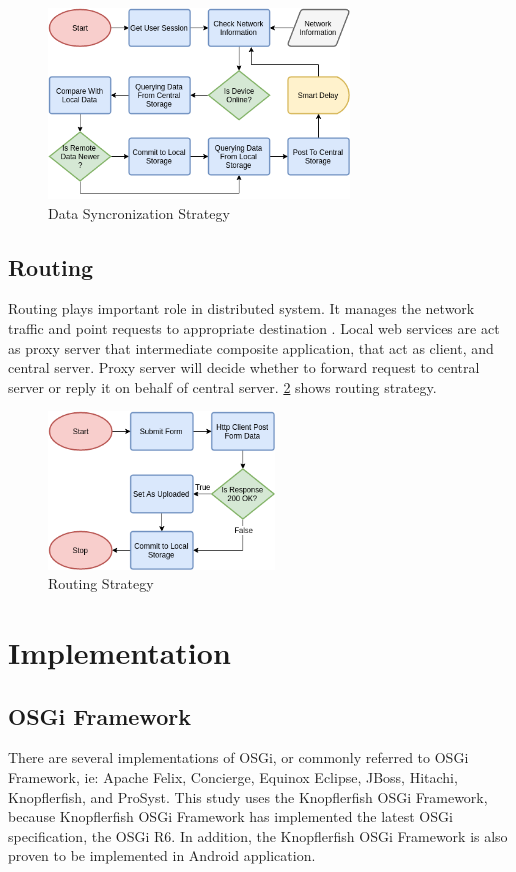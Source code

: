 \documentclass[conference]{IEEEtran}
\begin{document}
\begin{figure}
    \centering
    \includegraphics[width=8cm]{../../Resources/Images/data-sync-flowchart}
    \caption{Data Syncronization Strategy}
    \label{fig:data-sync-flowchart}
\end{figure}




\subsection{Routing}
Routing plays important role in distributed system. It manages the network traffic and point requests to appropriate destination \cite{takdir_multi-layer_2014}. Local web services are act as proxy server that intermediate composite application, that act as client, and central server. Proxy server will decide whether to forward request to central server or reply it on behalf of central server. \figurename{\ref{fig:routing-flowchart}} shows routing strategy.

\begin{figure}
    \centering
    \includegraphics[width=6cm]{../../Resources/Images/routing-flowchart}
    \caption{Routing Strategy}
    \label{fig:routing-flowchart}
\end{figure}



\section{Implementation}


\subsection{OSGi Framework}
There are several implementations of OSGi, or commonly referred to OSGi Framework, ie: Apache Felix, Concierge, Equinox Eclipse, JBoss, Hitachi, Knopflerfish, and ProSyst. This study uses the Knopflerfish OSGi Framework, because Knopflerfish OSGi Framework has implemented the latest OSGi specification, the OSGi R6. In addition, the Knopflerfish OSGi Framework is also proven to be implemented in Android application.
\end{document}
